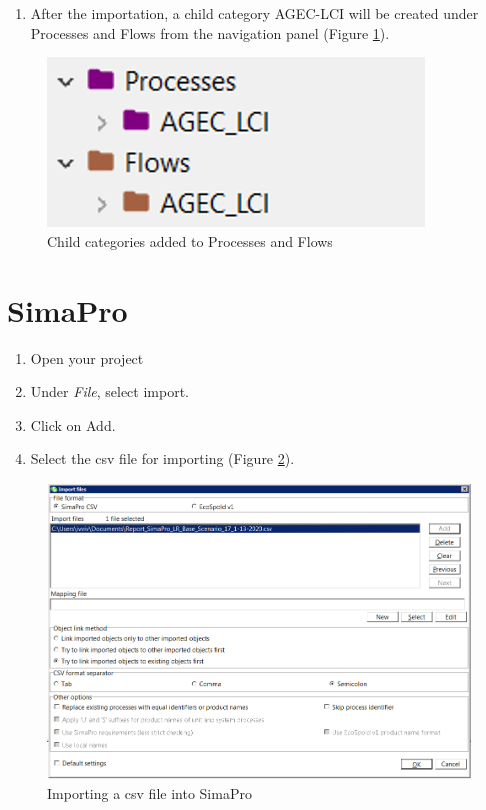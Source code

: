 \documentclass[openany]{book}
\providecommand{\tightlist}{%
  \setlength{\itemsep}{0pt}\setlength{\parskip}{0pt}}
\begin{document}
\begin{enumerate}
\def\labelenumi{\arabic{enumi}.}
\setcounter{enumi}{5}
\tightlist
\item
  After the importation, a child category AGEC-LCI will be created under Processes and Flows from the navigation panel (Figure \ref{fig:olca-step3}).
\end{enumerate}

\begin{figure}[ht]

{\centering \includegraphics[width=0.4\linewidth]{Figures/olca_step3} 

}

\caption{Child categories added to Processes and Flows}\label{fig:olca-step3}
\end{figure}

\hypertarget{import-simapro}{%
\section{SimaPro}\label{import-simapro}}

\begin{enumerate}
\def\labelenumi{\arabic{enumi}.}
\item
  Open your project
\item
  Under \emph{File}, select import.
\item
  Click on Add.
\item
  Select the csv file for importing (Figure \ref{fig:simapro-step1}).
\end{enumerate}

\begin{figure}[ht]

{\centering \includegraphics[width=0.85\linewidth]{Figures/simapro_step1} 

}

\caption{Importing a csv file into SimaPro}\label{fig:simapro-step1}
\end{figure}
\end{document}
